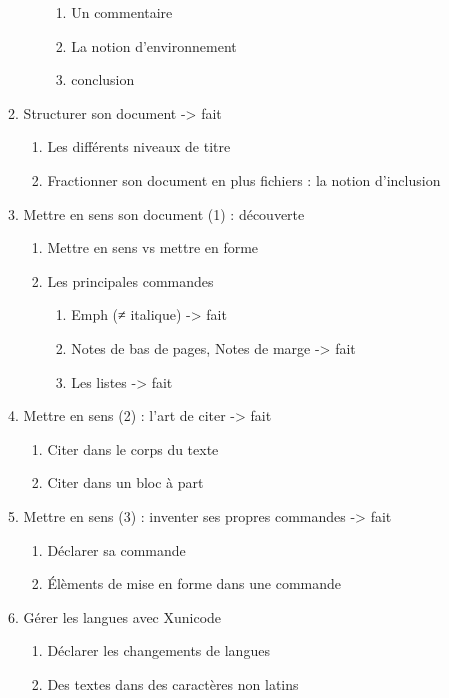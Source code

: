 \begin{enumerate}
\begin{enumerate}
\begin{enumerate}
\begin{enumerate}
			\item Un commentaire
			\item La notion d'environnement
			\item conclusion	
		\end{enumerate}
	\end{enumerate} 
	\item{Structurer son document}						-> fait
		\begin{enumerate}	
		\item Les différents niveaux de titre
		\item Fractionner son document en plus fichiers : la notion d'inclusion
		\end{enumerate}
	\item Mettre en sens son document (1) : découverte
	\begin{enumerate}
		\item Mettre en sens vs mettre en forme
		\item Les principales commandes
		\begin{enumerate}
			\item Emph (≠ italique)					-> fait
			\item Notes de bas de pages, Notes de marge	-> fait
			\item Les listes						-> fait
		\end{enumerate}
	\end{enumerate}
	\item Mettre en sens (2) : l'art de citer					-> fait
		\begin{enumerate}
		\item Citer dans le corps du texte	
		\item Citer dans un bloc à part
		\end{enumerate}
	\item Mettre en sens (3) : inventer ses propres commandes	-> fait
		\begin{enumerate}
		\item Déclarer sa commande
		\item Élèments de mise en forme dans une commande
		\end{enumerate}
	\item Gérer les langues avec Xunicode
		\begin{enumerate}
		\item Déclarer les changements de langues
		\item Des textes dans des caractères non latins
		\begin{enumerate}

\end{enumerate}
\end{enumerate}
\end{enumerate}
\end{enumerate}
